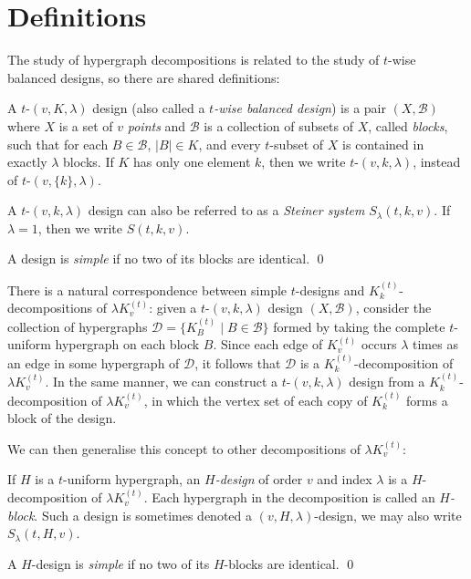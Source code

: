 \section{Definitions}


The study of hypergraph decompositions is related to the study of $t$-wise balanced designs, so there are shared definitions:

\begin{definition}
A $t$-$(v,K,\lambda)$ design (also called a {\em $t$-wise balanced design}) is a pair $(X, \mathcal{B})$ where $X$ is a set of $v$ {\em points} and $\mathcal{B}$ is a collection of subsets of $X$, called {\em blocks}, such that for each $B \in \mathcal{B}$, $|B| \in K$, and every $t$-subset of $X$ is contained in exactly $\lambda$ blocks.
If $K$ has only one element $k$, then we write $t$-$(v, k, \lambda)$, instead of $t$-$(v,\{k\},\lambda)$.

A $t$-$(v, k, \lambda)$ design can also be referred to as a {\em Steiner system} $S_{\lambda}(t, k, v)$.
If $\lambda = 1$, then we write $S(t, k, v)$.

A design is {\em simple} if no two of its blocks are identical.
\qed
\end{definition}

There is a natural correspondence between simple $t$-designs and $K_{k}^{(t)}$-decompositions of $\lambda K_{v}^{(t)}$: given a $t$-$(v, k, \lambda)$ design $(X, \mathcal{B})$, consider the collection of hypergraphs $\mathcal{D} = \{K_{B}^{(t)} \mid B \in \mathcal{B}\}$ formed by taking the complete $t$-uniform hypergraph on each block $B$.
Since each edge of $K_v^{(t)}$ occurs $\lambda$ times as an edge in some hypergraph of $\mathcal{D}$, it follows that $\mathcal{D}$ is a $K_{k}^{(t)}$-decomposition of $\lambda K_{v}^{(t)}$.
In the same manner, we can construct a $t$-$(v, k, \lambda)$ design from a $K_{k}^{(t)}$-decomposition of $\lambda K_{v}^{(t)}$, in which the vertex set of each copy of $K_k^{(t)}$ forms a block of the design.

We can then generalise this concept to other decompositions of $\lambda K_{v}^{(t)}$:

\begin{definition}
If $H$ is a $t$-uniform hypergraph, an {\em $H$-design} of order $v$ and index $\lambda$ is a $H$-decomposition of $\lambda K_{v}^{(t)}$.
Each hypergraph in the decomposition is called an {\em $H$-block}.
Such a design is sometimes denoted a $(v, H, \lambda)$-design, we may also write $S_{\lambda} (t, H, v)$.

A $H$-design is {\em simple} if no two of its $H$-blocks are identical.
\qed
\end{definition}

